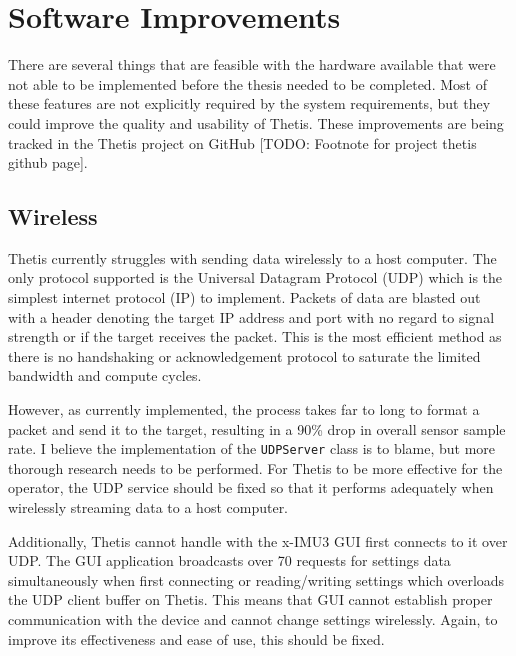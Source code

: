 \section{Software Improvements}
There are several things that are feasible with the hardware available that were not able to be implemented before the thesis needed to be completed.
Most of these features are not explicitly required by the system requirements, but they could improve the quality and usability of Thetis.
These improvements are being tracked in the Thetis project on GitHub [TODO: Footnote for project thetis github page].

\subsection{Wireless}
Thetis currently struggles with sending data wirelessly to a host computer.
The only protocol supported is the Universal Datagram Protocol (UDP) which is the simplest internet protocol (IP) to implement.
Packets of data are blasted out with a header denoting the target IP address and port with no regard to signal strength or if the target receives the packet.
This is the most efficient method as there is no handshaking or acknowledgement protocol to saturate the limited bandwidth and compute cycles.

However, as currently implemented, the process takes far to long to format a packet and send it to the target, resulting in a 90\% drop in overall sensor sample rate.
I believe the implementation of the \lstinline[style=customInline]|UDPServer| class is to blame, but more thorough research needs to be performed.
For Thetis to be more effective for the operator, the UDP service should be fixed so that it performs adequately when wirelessly streaming data to a host computer.

Additionally, Thetis cannot handle with the x-IMU3 GUI first connects to it over UDP.
The GUI application broadcasts over 70 requests for settings data simultaneously when first connecting or reading/writing settings which overloads the UDP client buffer on Thetis.
This means that GUI cannot establish proper communication with the device and cannot change settings wirelessly.
Again, to improve its effectiveness and ease of use, this should be fixed.

